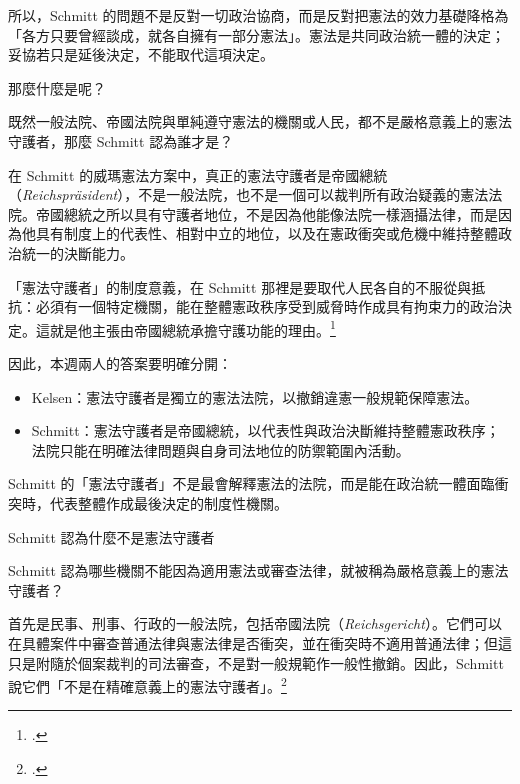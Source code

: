 所以，Schmitt 的問題不是反對一切政治協商，而是反對把憲法的效力基礎降格為「各方只要曾經談成，就各自擁有一部分憲法」。憲法是共同政治統一體的決定；妥協若只是延後決定，不能取代這項決定。


\begin{qaprompt}
那麼什麼是呢？
\end{qaprompt}

\begin{qaquestion}
既然一般法院、帝國法院與單純遵守憲法的機關或人民，都不是嚴格意義上的憲法守護者，那麼 Schmitt 認為誰才是？
\end{qaquestion}

在 Schmitt 的威瑪憲法方案中，真正的憲法守護者是帝國總統（\emph{Reichspräsident}），不是一般法院，也不是一個可以裁判所有政治疑義的憲法法院。帝國總統之所以具有守護者地位，不是因為他能像法院一樣涵攝法律，而是因為他具有制度上的代表性、相對中立的地位，以及在憲政衝突或危機中維持整體政治統一的決斷能力。

「憲法守護者」的制度意義，在 Schmitt 那裡是要取代人民各自的不服從與抵抗：必須有一個特定機關，能在整體憲政秩序受到威脅時作成具有拘束力的政治決定。這就是他主張由帝國總統承擔守護功能的理由。\footcites[22ff.]{schmitt1931}[90, ch.~6]{schmitt2015}

因此，本週兩人的答案要明確分開：

\begin{itemize}
\tightlist
\item
  Kelsen：憲法守護者是獨立的憲法法院，以撤銷違憲一般規範保障憲法。
\item
  Schmitt：憲法守護者是帝國總統，以代表性與政治決斷維持整體憲政秩序；法院只能在明確法律問題與自身司法地位的防禦範圍內活動。
\end{itemize}

Schmitt 的「憲法守護者」不是最會解釋憲法的法院，而是能在政治統一體面臨衝突時，代表整體作成最後決定的制度性機關。


\begin{qaprompt}
Schmitt 認為什麼不是憲法守護者
\end{qaprompt}

\begin{qaquestion}
Schmitt 認為哪些機關不能因為適用憲法或審查法律，就被稱為嚴格意義上的憲法守護者？
\end{qaquestion}

首先是民事、刑事、行政的一般法院，包括帝國法院（\emph{Reichsgericht}）。它們可以在具體案件中審查普通法律與憲法律是否衝突，並在衝突時不適用普通法律；但這只是附隨於個案裁判的司法審查，不是對一般規範作一般性撤銷。因此，Schmitt 說它們「不是在精確意義上的憲法守護者」。\footcites[12]{schmitt1931}[82--83]{schmitt2015}

